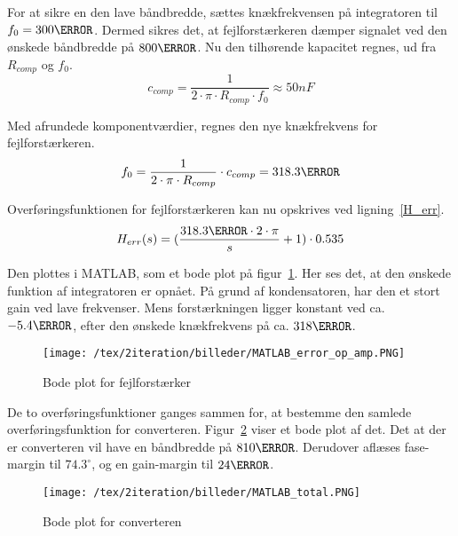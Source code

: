 \noindent For at sikre en den lave båndbredde, sættes knækfrekvensen på integratoren til $f_0=300\hertz$. Dermed sikres det, at fejlforstærkeren dæmper signalet ved den ønskede båndbredde på $800\hertz$. Nu den tilhørende kapacitet regnes, ud fra $R_{comp}$ og $f_0$.
\begin{equation} \label{c_comp}
c_{comp} = \frac{1}{2\cdot \pi \cdot R_{comp} \cdot f_0} \approx 50nF
\end{equation}

\noindent Med afrundede komponentværdier, regnes den nye knækfrekvens for fejlforstærkeren.
\begin{equation} \label{f_0}
f_0 = \frac{1}{2\cdot \pi \cdot R_{comp}} \cdot c_{comp} = 318.3\hertz
\end{equation}

\noindent Overføringsfunktionen for fejlforstærkeren kan nu opskrives ved ligning~\ref{H_err}.
\begin{equation} \label{H_err}
H_{err}(s) = (\frac{318.3\hertz \cdot 2\cdot\pi}{s} + 1) \cdot 0.535
\end{equation}

\noindent Den plottes i MATLAB, som et bode plot på figur~\ref{fig:MATLAB_error_op_amp_2}. Her ses det, at den ønskede funktion af integratoren er opnået. På grund af kondensatoren, har den et stort gain ved lave frekvenser. Mens forstærkningen ligger konstant ved ca. $-5.4\decibel$, efter den ønskede knækfrekvens på ca. $318\hertz$.

\begin{figure}[H]
	\center
	\texttt{[image: /tex/2iteration/billeder/MATLAB\_error\_op\_amp.PNG]}
	\caption{Bode plot for fejlforstærker}
	\label{fig:MATLAB_error_op_amp_2}
\end{figure}

De to overføringsfunktioner ganges sammen for, at bestemme den samlede overføringsfunktion for converteren. Figur~\ref{fig:MATLAB_total_2} viser et bode plot af det. Det at der er converteren vil have en båndbredde på $810\hertz$. Derudover aflæses fase-margin til $74.3^\circ$, og en gain-margin til $24\decibel$.

\begin{figure}[H]
	\center
	\texttt{[image: /tex/2iteration/billeder/MATLAB\_total.PNG]}
	\caption{Bode plot for converteren}
	\label{fig:MATLAB_total_2}
\end{figure} 


